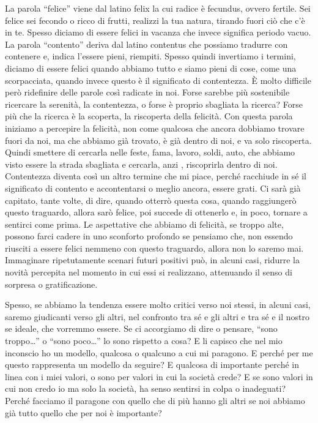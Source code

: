 \documentclass[12pt]{book} %
\begin{document}
La parola “felice” viene dal latino felix la cui radice è fecundus, ovvero fertile. Sei felice sei fecondo o ricco di
frutti, realizzi la tua natura, tirando fuori ciò che c'è in te. Spesso diciamo di essere felici in vacanza che  invece significa periodo vacuo. 
La parola “contento” deriva dal latino contentus che possiamo tradurre con contenere e, indica l'essere pieni, riempiti. Spesso
quindi invertiamo i termini, diciamo di essere felici quando abbiamo tutto e siamo pieni di cose, come una
scorpacciata, quando invece questo è il significato di contentezza. È molto difficile però ridefinire delle parole così
radicate in noi. Forse sarebbe più sostenibile ricercare la serenità, la contentezza, o forse è proprio sbagliata la
ricerca? Forse più che la ricerca è la scoperta, la riscoperta della felicità. Con questa parola iniziamo a percepire
la felicità, non come qualcosa che ancora dobbiamo trovare fuori da noi, ma che abbiamo già trovato, è già dentro di
noi, e va solo riscoperta. Quindi smettere di cercarla nelle feste, fama, lavoro, soldi, auto, che abbiamo visto essere
la strada sbagliata e cercarla, anzi , riscoprirla dentro di noi. Contentezza diventa così un altro termine che mi
piace, perché racchiude in sé il significato di contento e accontentarsi o meglio ancora, essere grati. Ci sarà già capitato, tante volte, di
dire, quando otterrò questa cosa, quando raggiungerò questo traguardo, allora sarò felice, poi succede di ottenerlo e, in poco, tornare a sentirci come prima. Le aspettative che abbiamo di felicità, se troppo alte, possono farci
cadere in uno sconforto profondo se pensiamo che, non essendo riusciti a essere felici nemmeno con questo
traguardo, allora non lo saremo mai. Immaginare ripetutamente scenari futuri positivi può, in alcuni casi, ridurre la novità percepita nel momento in cui essi si realizzano, attenuando il senso di sorpresa o gratificazione. 

Spesso, se abbiamo la tendenza essere molto critici verso noi stessi, in alcuni casi, saremo giudicanti verso gli altri, nel
confronto tra sé e gli altri e tra sé e il nostro se ideale, che vorremmo essere. Se ci accorgiamo di dire o pensare,
“sono troppo…” o “sono poco…” lo sono rispetto a cosa? E li capisco che nel mio inconscio ho un modello, qualcosa o
qualcuno a cui mi paragono. E perché per me questo rappresenta un modello da seguire? E qualcosa di importante perché
in linea con i miei valori, o sono per valori in cui la società crede? E se sono valori in cui non credo io ma solo la
società, ha senso sentirsi in colpa o inadeguati? Perché facciamo il paragone con quello che di più hanno gli altri se
noi abbiamo già tutto quello che per noi è importante?
\end{document}
